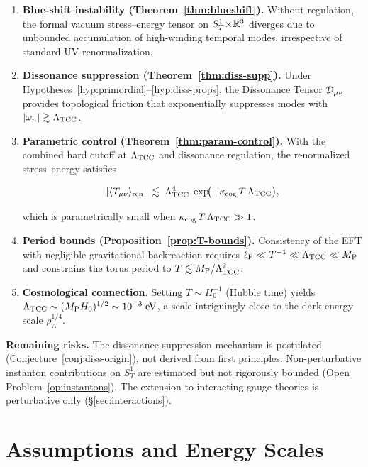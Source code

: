 \documentclass[12pt,openany]{book}
\begin{document}
\begin{enumerate}
  \item \textbf{Blue-shift instability (Theorem~\ref{thm:blueshift}).}
    Without regulation, the formal vacuum stress--energy tensor on
    $S^{1}_{T}\!\times\!\mathbb{R}^{3}$ diverges due to unbounded accumulation of high-winding
    temporal modes, irrespective of standard UV renormalization.
  \item \textbf{Dissonance suppression (Theorem~\ref{thm:diss-supp}).}
    Under Hypotheses~\ref{hyp:primordial}--\ref{hyp:diss-props},
    the Dissonance Tensor $\mathcal{D}_{\mu\nu}$ provides topological friction
    that exponentially suppresses modes with
    $\lvert \omega_n \rvert\gtrsim\Lambda_{\mathrm{TCC}}$.
  \item \textbf{Parametric control (Theorem~\ref{thm:param-control}).}
    With the combined hard cutoff at $\Lambda_{\mathrm{TCC}}$ and dissonance regulation,
    the renormalized stress--energy satisfies
    

\[
      \lvert \langle T_{\mu\nu} \rangle_{\mathrm{ren}} \rvert \;\lesssim\;
        \Lambda_{\mathrm{TCC}}^{4}\;\exp\!\bigl(-\kappa_{\mathrm{cog}}\, T\,\Lambda_{\mathrm{TCC}}\bigr),
    \]


    which is parametrically small when $\kappa_{\mathrm{cog}}\,T\,\Lambda_{\mathrm{TCC}} \gg 1$.
  \item \textbf{Period bounds (Proposition~\ref{prop:T-bounds}).}
    Consistency of the EFT with negligible gravitational backreaction
    requires
    $\ell_{\mathrm{P}} \ll T^{-1} \ll \Lambda_{\mathrm{TCC}} \ll M_{\mathrm{P}}$
    and constrains the torus period to
    $T \lesssim M_{\mathrm{P}} / \Lambda_{\mathrm{TCC}}^{2}$.
  \item \textbf{Cosmological connection.}
    Setting $T\sim H_{0}^{-1}$ (Hubble time) yields
    $\Lambda_{\mathrm{TCC}} \sim (M_{\mathrm{P}} H_{0})^{1/2} \sim 10^{-3}\;\mathrm{eV}$,
    a scale intriguingly close to the dark-energy scale $\rho_{\Lambda}^{1/4}$.
\end{enumerate}

\noindent\textbf{Remaining risks.}
The dissonance-suppression mechanism is postulated (Conjecture~\ref{conj:diss-origin}),
not derived from first principles.
Non-perturbative instanton contributions on $S^{1}_{T}$ are estimated but
not rigorously bounded (Open Problem~\ref{op:instantons}).
The extension to interacting gauge theories is perturbative only
(\S\ref{sec:interactions}).


\section{Assumptions and Energy Scales}
\label{sec:assumptions}
\end{document}
